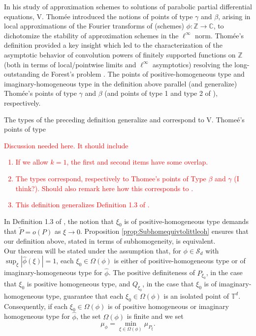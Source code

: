 \documentclass[11pt]{article}
\begin{document}
\noindent In his study of approximation schemes to solutions of parabolic partial differential equations, V. Thom\'{e}e introduced the notions of points of type $\gamma$ and $\beta$, arising in local approximations of the Fourier transforms of (schemes) $\phi:\mathbb{Z}\to\mathbb{C}$, to dichotomize the stability of approximation schemes in the $\ell^\infty$ norm\cite{Thomee1965}. Thom\'{e}e's definition provided a key insight which led to the characterization of the asymptotic behavior of convolution powers of finitely supported functions on $\mathbb{Z}$ (both in terms of local/pointwise limits and $\ell^\infty$ asymptotics) resolving the long-outstanding de Forest's problem \cite{Randles2015}. The points of positive-homogeneous type and imaginary-homogeneous type in the definition above parallel (and generalize) Thom\'{e}e's points of type $\gamma$ and $\beta$ (and points of type 1 and type 2 of \cite{Randles2015}), respectively.



The types of the preceding definition generalize and correspond to V. Thome\'{e}'s points of type 



\textcolor{red}{Discussion needed here. It should include
\begin{enumerate}
    \item If we allow $k=1$, the first and second items have some overlap. 
    \item The types correspond, respectively to Thomee's points of Type $\beta$ and $\gamma$ (I think?). Should also remark here how this corresponds to \cite{Randles2015}.
    \item This definition generalizes Definition 1.3 of \cite{Randles2017}.
\end{enumerate}}
In Definition 1.3 of \cite{Randles2017}, the notion that $\xi_0$ is of positive-homogeneous type demands that $\widetilde{P}=o(P)$ as $\xi\to 0$. Proposition \ref{prop:Subhomequivtolittleoh} ensures that our definition above, stated in terms of subhomogeneity, is equivalent.\\


\noindent Our theorem will be stated under the assumption that, for $\phi\in\mathcal{S}_d$ with $\sup_\xi|\widehat{\phi}(\xi)|=1$, each $\xi_0\in\Omega(\phi)$ is either of positive-homogeneous type or of imaginary-homogeneous type for $\widehat{\phi}$. The positive definiteness of $P_{\xi_0}$, in the case that $\xi_0$ is positive homogeneous type, and $Q_{\xi_0}$, in the case that $\xi_0$ is of imaginary-homogeneous type, guarantee that each $\xi_0\in\Omega(\phi)$ is an isolated point of $\mathbb{T}^d$. Consequently, if each $\xi_0\in\Omega(\phi)$ is of positive homogeneous or imaginary homogeneous type for $\widehat{\phi}$, the set $\Omega(\phi)$ is finite and we set
\begin{equation*}
    \mu_{\phi}=\min_{\xi\in\Omega(\phi)}\mu_{P_\xi}.
\end{equation*}
\end{document}
